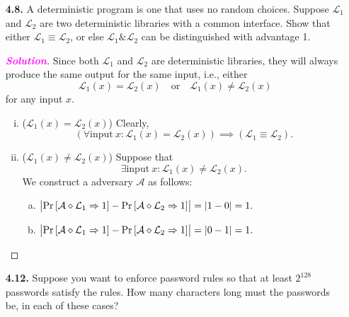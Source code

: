 \documentclass[12pt,openany]{book}
\theoremstyle{definition}
\newcommand{\ie}{\textnormal{i.e.}}
\renewcommand{\abs}[1]{\left\lvert #1 \right\rvert}
\newcommand{\sol}{\textcolor{magenta}{\bf Solution}}
\newcommand{\library}{\mathcal{L}}
\newcommand{\adversary}{\mathcal{A}}
\newcommand{\linking}{\diamond}
\newcommand{\outputs}{\Rightarrow}
\begin{document}
\begin{itemize}
\begin{proof}[\sol]
\[				\] Then \(p\) is non-zero polynomial and $f$ is non-zero function, and so \[
				\lim\limits_{\lambda\to\infty} q(\lambda)=\frac{c}{\lim\limits_{\lambda\to\infty}p(\lambda)f(\lambda)}=\frac{c}{\text{constant}}.
				\] Thus \(\lim\limits_{\lambda\to\infty}p(\lambda)f(\lambda)\) cannot be a zero.
			\end{proof}
		\vspace{8pt}
		\newpage
		\item[\bf 4.8.] A deterministic program is one that uses no random choices. Suppose $\library_{1}$ and $\library_{2}$ are two deterministic libraries with a common interface. Show that either $\library_{1}\equiv\library_{2}$, or else $\library_{1}\&\library_{2}$ can be distinguished with advantage 1.
			\begin{proof}[\sol]
				Since both \(\library_{1}\) and \(\library_{2}\) are deterministic libraries,  they will always produce the same output for the same input, \ie, either \[
				\library_{1}(x)=\library_{2}(x)\quad\text{or}\quad \library_{1}(x)\neq\library_{2}(x)
				\] for any input \(x\).
				\begin{enumerate}[(i)]
					\item ($\library_{1}(x)=\library_{2}(x)$) Clearly, \[
					(\forall\text{input}\ x:\library_{1}(x)=\library_{2}(x)) \implies(\library_{1}\equiv\library_{2}).
					\]
					\item ($\library_{1}(x)\neq\library_{2}(x)$) Suppose that \[
					\exists\text{input}\ x:\library_{1}(x)\neq\library_{2}(x).
					\] We construct a adversary \(\adversary\) as follows:
					\begin{enumerate}[(a)]
						\item \(\abs{\Pr\sbr{\adversary\linking\library_{1}\outputs 1}-\Pr\sbr{\adversary\linking\library_{2}\outputs 1}}=\abs{1-0}=1.\)
						\item \(\abs{\Pr\sbr{\adversary\linking\library_{1}\outputs 1}-\Pr\sbr{\adversary\linking\library_{2}\outputs 1}}=\abs{0-1}=1.\)
					\end{enumerate}
				\end{enumerate}
			\end{proof}
		\newpage
		\item[\bf 4.12.] Suppose you want to enforce password rules so that at least \(2^{128}\) passwords satisfy the
		rules. How many characters long must the passwords be, in each of these cases?

\end{itemize}
\end{document}

